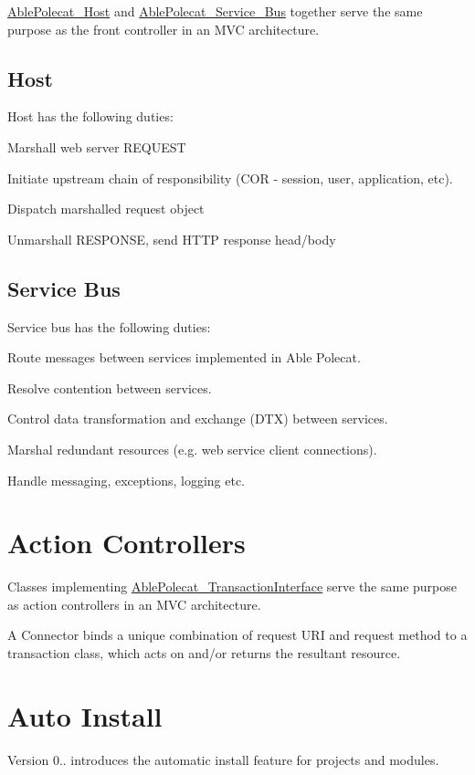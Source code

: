 \hyperlink{class_able_polecat___host}{Able\+Polecat\+\_\+\+Host} and \hyperlink{class_able_polecat___service___bus}{Able\+Polecat\+\_\+\+Service\+\_\+\+Bus} together serve the same purpose as the front controller in an M\+V\+C architecture.\hypertarget{index_host}{}\subsection{Host}\label{index_host}
Host has the following duties\+:
\begin{DoxyEnumerate}
\item Marshall web server R\+E\+Q\+U\+E\+S\+T
\item Initiate upstream chain of responsibility (C\+O\+R -\/ session, user, application, etc).
\item Dispatch marshalled request object
\item Unmarshall R\+E\+S\+P\+O\+N\+S\+E, send H\+T\+T\+P response head/body
\end{DoxyEnumerate}\hypertarget{index_bus}{}\subsection{Service Bus}\label{index_bus}
Service bus has the following duties\+:
\begin{DoxyEnumerate}
\item Route messages between services implemented in Able Polecat.
\item Resolve contention between services.
\item Control data transformation and exchange (D\+T\+X) between services.
\item Marshal redundant resources (e.\+g. web service client connections).
\item Handle messaging, exceptions, logging etc.
\end{DoxyEnumerate}\hypertarget{index_action_controller}{}\section{Action Controllers}\label{index_action_controller}
Classes implementing \hyperlink{interface_able_polecat___transaction_interface}{Able\+Polecat\+\_\+\+Transaction\+Interface} serve the same purpose as action controllers in an M\+V\+C architecture.

A Connector binds a unique combination of request U\+R\+I and request method to a transaction class, which acts on and/or returns the resultant resource.\hypertarget{index_auto_install}{}\section{Auto Install}\label{index_auto_install}
Version 0.. introduces the automatic install feature for projects and modules.



